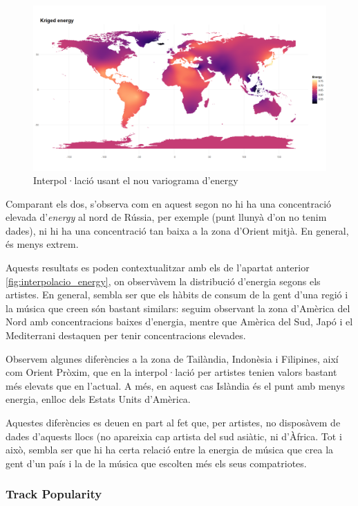 \begin{figure}
    \centering
    \includegraphics[width=0.8\linewidth]{Images//7_Geospatial//3_new/energy_interpolation_2.png}
    \caption{Interpol·lació usant el nou variograma d'energy}
    \label{fig:geo_new_energy_interpol2}
\end{figure}

Comparant els dos, s'observa com en aquest segon no hi ha una concentració elevada d'\textit{energy} al nord de Rússia, per exemple (punt llunyà d'on no tenim dades), ni hi ha una concentració tan baixa a la zona d'Orient mitjà. En general, és menys extrem.

Aquests resultats es poden contextualitzar amb els de l'apartat anterior \ref{fig:interpolacio_energy}, on observàvem la distribució d'energia segons els artistes. En general, sembla ser que els hàbits de consum de la gent d'una regió i la música que creen són bastant similars: seguim observant la zona d'Amèrica del Nord amb concentracions baixes d'energia, mentre que Amèrica del Sud, Japó i el Mediterrani destaquen per tenir concentracions elevades.

Observem algunes diferències a la zona de Tailàndia, Indonèsia i Filipines, així com Orient Pròxim, que en la interpol·lació per artistes tenien valors bastant més elevats que en l'actual. A més, en aquest cas Islàndia és el punt amb menys energia, enlloc dels Estats Units d'Amèrica. 

Aquestes diferències es deuen en part al fet que, per artistes, no disposàvem de dades d'aquests llocs (no apareixia cap artista del sud asiàtic, ni d'Àfrica. Tot i això, sembla ser que hi ha certa relació entre la energia de música que crea la gent d'un país i la de la música que escolten més els seus compatriotes.

\subsubsection{Track Popularity}

